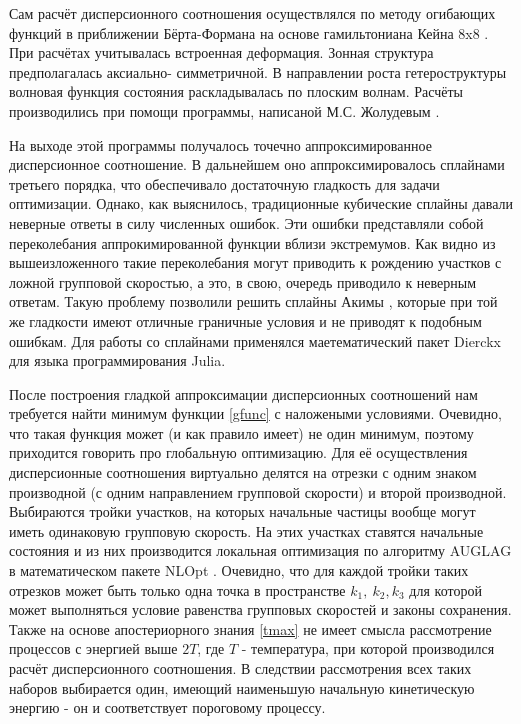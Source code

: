 \documentclass[../main.tex]{subfiles}
\begin{document}
        Сам расчёт дисперсионного соотношения осуществлялся по методу огибающих функций
        в приближении Бёрта-Формана на основе гамильтониана Кейна 8x8 \cite{Novik:2005}. При расчётах
        учитывалась встроенная деформация. Зонная структура предполагалась аксиально-
        симметричной. В направлении роста гетероструктуры волновая функция состояния
        раскладывалась по плоским волнам. Расчёты производились при помощи программы,
        написаной М.С. Жолудевым \cite{Zholudev:PRB:2012}.

        На выходе этой программы получалось точечно аппроксимированное дисперсионное 
        соотношение. В дальнейшем оно аппроксимировалось сплайнами третьего порядка,
        что обеспечивало достаточную гладкость для задачи оптимизации. Однако, 
        как выяснилось, традиционные кубические сплайны давали неверные ответы в силу
        численных ошибок. Эти ошибки представляли собой переколебания аппрокимированной
        функции вблизи экстремумов. Как видно из вышеизложенного такие переколебания 
        могут приводить к рождению участков с ложной групповой скоростью, а это, в свою,
        очередь приводило к неверным ответам. Такую проблему позволили решить сплайны 
        Акимы \cite{AkimaSplines}, которые при той же гладкости имеют отличные граничные 
        условия и не приводят к подобным ошибкам. Для работы со сплайнами применялся
        маетематический пакет Dierckx \cite{Dierckx} для языка программирования 
        Julia. 

        После построения гладкой аппроксимации дисперсионных соотношений нам требуется 
        найти минимум функции \ref{gfunc} с наложеными условиями. Очевидно, что такая 
        функция может (и как правило имеет) не один минимум, поэтому приходится говорить
        про глобальную оптимизацию. Для её осуществления дисперсионные соотношения виртуально
        делятся на отрезки с одним знаком производной (с одним направлением групповой скорости)
        и второй производной. Выбираются тройки участков, на которых начальные частицы вообще 
        могут иметь одинаковую групповую скорость. На этих участках ставятся начальные состояния
        и из них производится локальная оптимизация по алгоритму AUGLAG \cite{AuglagOptim} в математическом пакете NLOpt
        \cite{NLopt}. Очевидно, что для каждой тройки таких отрезков
        может быть только одна точка в пространстве $k_1,~k_2,k_3$ для которой может выполняться
        условие равенства групповых скоростей и законы сохранения. Также на основе апостериорного 
        знания \ref{tmax} не имеет смысла рассмотрение 
        процессов с энергией выше $2T$, где $T$ - температура, при которой производился расчёт 
        дисперсионного соотношения. В следствии рассмотрения всех 
        таких наборов выбирается один, имеющий наименьшую начальную кинетическую энергию - он и 
        соответствует пороговому процессу.
\end{document}
